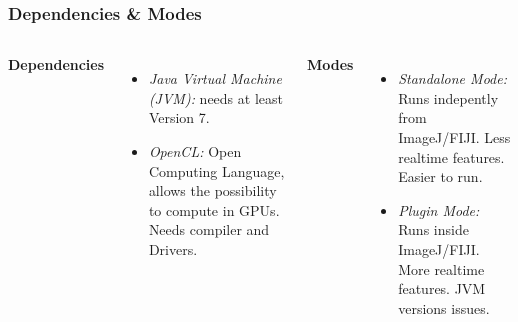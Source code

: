 \documentclass[aspectratio=169]{beamer}
\begin{document}
\begin{frame}
\frametitle{Dependencies \& Modes}

\begin{columns}[c]



\textbf{Dependencies}

\begin{itemize}
 \item \emph{Java Virtual Machine (JVM):} needs at least Version 7. 
 \item \emph{OpenCL:} Open Computing Language, allows the possibility to compute in GPUs. Needs compiler and Drivers. 
\end{itemize}

\textbf{Modes}

\begin{itemize}
 \item \emph{Standalone Mode:} Runs indepently from ImageJ/FIJI. Less realtime features. Easier to run. 
 \item \emph{Plugin Mode:} Runs inside ImageJ/FIJI. More realtime features. JVM versions issues.  
\end{itemize}


 


\end{columns}
\end{frame}
\end{document}

